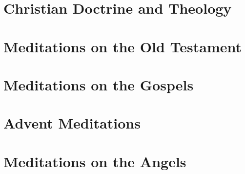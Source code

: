 \documentclass[a4paper,12pt,twoside]{book}
\begin{document}
\chapter{Christian Doctrine and Theology}






















\chapter{Meditations on the Old Testament}




\chapter{Meditations on the Gospels}








\chapter{Advent Meditations}






\chapter{Meditations on the Angels}







\end{document}
